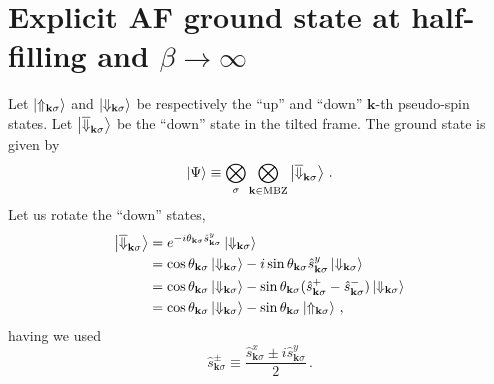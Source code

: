 \section{Explicit AF ground state at half-filling and $\beta \to \infty$}\label{appsubsec:af-T=0-gs}

Let $\ket{\Uparrow_{\mathbf{k}\sigma}}$ and $\ket{\Downarrow_{\mathbf{k}\sigma}}$ be respectively the ``up'' and ``down'' $\mathbf{k}$-th pseudo-spin states. Let $\ket{\overline{\Downarrow}_{\mathbf{k}\sigma}}$ be the ``down'' state in the tilted frame. The ground state is given by
\begin{equation}\label{appeq:af-hm-gs-1}
	\ket{\Psi} \equiv \bigotimes_\sigma \bigotimes_{\mathbf{k}\in\mathrm{MBZ}} \ket{\overline{\Downarrow}_{\mathbf{k}\sigma}} \, .
\end{equation}
Let us rotate the ``down'' states,
\begin{align}
	\ket{\overline{\Downarrow}_{\mathbf{k}\sigma}} &= e^{-i\theta_{\mathbf{k}\sigma} \hat s_{\mathbf{k}\sigma}^y} \ket{\Downarrow_{\mathbf{k}\sigma}} \nonumber \\
	&= \cos \theta_{\mathbf{k}\sigma} \ket{\Downarrow_{\mathbf{k}\sigma}} - i \sin\theta_{\mathbf{k}\sigma} \hat s_{\mathbf{k}\sigma}^y \ket{\Downarrow_{\mathbf{k}\sigma}} \nonumber \\
	&= \cos \theta_{\mathbf{k}\sigma} \ket{\Downarrow_{\mathbf{k}\sigma}} - \sin\theta_{\mathbf{k}\sigma} (\hat s_{\mathbf{k}\sigma}^+ - \hat s_{\mathbf{k}\sigma}^-) \ket{\Downarrow_{\mathbf{k}\sigma}} \nonumber \\
	&= \cos \theta_{\mathbf{k}\sigma} \ket{\Downarrow_{\mathbf{k}\sigma}} - \sin\theta_{\mathbf{k}\sigma} \ket{\Uparrow_{\mathbf{k}\sigma}} \, , \label{appeq:af-hm-tilted-down}
\end{align}
having we used
\[
	\hat s_{\mathbf{k}\sigma}^\pm \equiv \frac{\hat s_{\mathbf{k}\sigma}^x \pm i\hat s_{\mathbf{k}\sigma}^y}{2} \, .
\]

